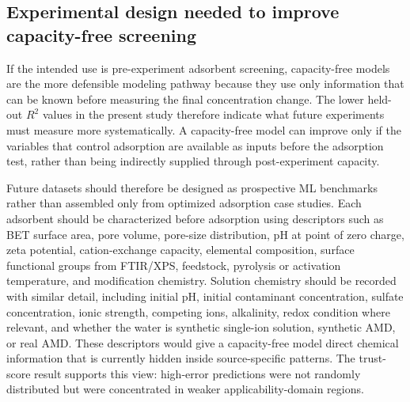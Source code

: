 \documentclass[review,12pt,number]{elsarticle}
\begin{document}
\subsection{Experimental design needed to improve capacity-free screening}

If the intended use is pre-experiment adsorbent screening, capacity-free models are the more defensible modeling pathway because they use only information that can be known before measuring the final concentration change. The lower held-out $R^2$ values in the present study therefore indicate what future experiments must measure more systematically. A capacity-free model can improve only if the variables that control adsorption are available as inputs before the adsorption test, rather than being indirectly supplied through post-experiment capacity.

Future datasets should therefore be designed as prospective ML benchmarks rather than assembled only from optimized adsorption case studies. Each adsorbent should be characterized before adsorption using descriptors such as BET surface area, pore volume, pore-size distribution, pH at point of zero charge, zeta potential, cation-exchange capacity, elemental composition, surface functional groups from FTIR/XPS, feedstock, pyrolysis or activation temperature, and modification chemistry. Solution chemistry should be recorded with similar detail, including initial pH, initial contaminant concentration, sulfate concentration, ionic strength, competing ions, alkalinity, redox condition where relevant, and whether the water is synthetic single-ion solution, synthetic AMD, or real AMD. These descriptors would give a capacity-free model direct chemical information that is currently hidden inside source-specific patterns. The trust-score result supports this view: high-error predictions were not randomly distributed but were concentrated in weaker applicability-domain regions.
\end{document}

